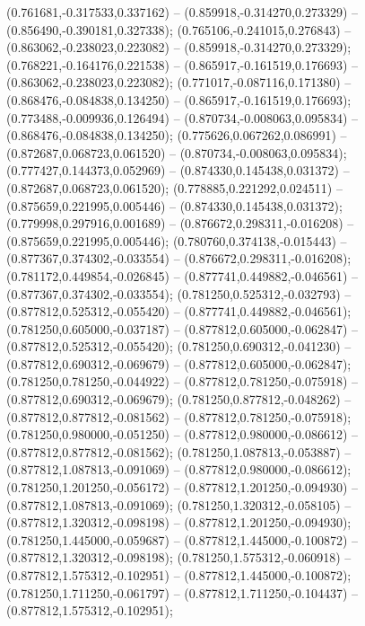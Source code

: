  (0.761681,-0.317533,0.337162) -- (0.859918,-0.314270,0.273329) -- (0.856490,-0.390181,0.327338);
 (0.765106,-0.241015,0.276843) -- (0.863062,-0.238023,0.223082) -- (0.859918,-0.314270,0.273329);
 (0.768221,-0.164176,0.221538) -- (0.865917,-0.161519,0.176693) -- (0.863062,-0.238023,0.223082);
 (0.771017,-0.087116,0.171380) -- (0.868476,-0.084838,0.134250) -- (0.865917,-0.161519,0.176693);
 (0.773488,-0.009936,0.126494) -- (0.870734,-0.008063,0.095834) -- (0.868476,-0.084838,0.134250);
 (0.775626,0.067262,0.086991) -- (0.872687,0.068723,0.061520) -- (0.870734,-0.008063,0.095834);
 (0.777427,0.144373,0.052969) -- (0.874330,0.145438,0.031372) -- (0.872687,0.068723,0.061520);
 (0.778885,0.221292,0.024511) -- (0.875659,0.221995,0.005446) -- (0.874330,0.145438,0.031372);
 (0.779998,0.297916,0.001689) -- (0.876672,0.298311,-0.016208) -- (0.875659,0.221995,0.005446);
 (0.780760,0.374138,-0.015443) -- (0.877367,0.374302,-0.033554) -- (0.876672,0.298311,-0.016208);
 (0.781172,0.449854,-0.026845) -- (0.877741,0.449882,-0.046561) -- (0.877367,0.374302,-0.033554);
 (0.781250,0.525312,-0.032793) -- (0.877812,0.525312,-0.055420) -- (0.877741,0.449882,-0.046561);
 (0.781250,0.605000,-0.037187) -- (0.877812,0.605000,-0.062847) -- (0.877812,0.525312,-0.055420);
 (0.781250,0.690312,-0.041230) -- (0.877812,0.690312,-0.069679) -- (0.877812,0.605000,-0.062847);
 (0.781250,0.781250,-0.044922) -- (0.877812,0.781250,-0.075918) -- (0.877812,0.690312,-0.069679);
 (0.781250,0.877812,-0.048262) -- (0.877812,0.877812,-0.081562) -- (0.877812,0.781250,-0.075918);
 (0.781250,0.980000,-0.051250) -- (0.877812,0.980000,-0.086612) -- (0.877812,0.877812,-0.081562);
 (0.781250,1.087813,-0.053887) -- (0.877812,1.087813,-0.091069) -- (0.877812,0.980000,-0.086612);
 (0.781250,1.201250,-0.056172) -- (0.877812,1.201250,-0.094930) -- (0.877812,1.087813,-0.091069);
 (0.781250,1.320312,-0.058105) -- (0.877812,1.320312,-0.098198) -- (0.877812,1.201250,-0.094930);
 (0.781250,1.445000,-0.059687) -- (0.877812,1.445000,-0.100872) -- (0.877812,1.320312,-0.098198);
 (0.781250,1.575312,-0.060918) -- (0.877812,1.575312,-0.102951) -- (0.877812,1.445000,-0.100872);
 (0.781250,1.711250,-0.061797) -- (0.877812,1.711250,-0.104437) -- (0.877812,1.575312,-0.102951);
